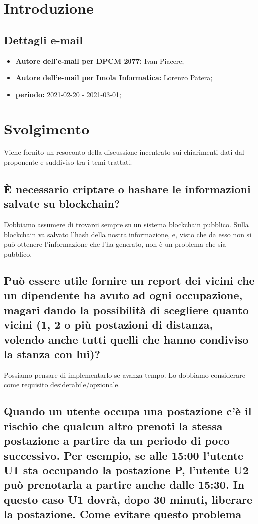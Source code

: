 \section*{Introduzione}
\subsection*{Dettagli e-mail}
\begin{itemize}
	\item \textbf{Autore dell'e-mail per DPCM 2077:} Ivan Piacere;
	\item \textbf{Autore dell'e-mail per Imola Informatica:} Lorenzo Patera;
	\item \textbf{periodo:} 2021-02-20 - 2021-03-01;
\end{itemize}

\section*{Svolgimento}
Viene fornito un resoconto della discussione incentrato sui chiarimenti dati dal proponente e suddiviso tra i temi trattati.


\subsection*{È necessario criptare o hashare le informazioni salvate su blockchain?}
Dobbiamo assumere di trovarci sempre su un sistema blockchain pubblico.
Sulla blockchain va salvato l'hash della nostra informazione, e, visto che da esso non si può ottenere l'informazione che l'ha generato, non è un problema che sia pubblico.


\subsection*{Può essere utile fornire un report dei vicini che un dipendente ha avuto ad ogni occupazione, magari dando la possibilità di scegliere quanto vicini (1, 2 o più postazioni di distanza, volendo anche tutti quelli che hanno condiviso la stanza con lui)?}
Possiamo pensare di implementarlo se avanza tempo. Lo dobbiamo considerare come requisito desiderabile/opzionale.


\subsection{Quando un utente occupa una postazione c’è il rischio che qualcun altro prenoti la stessa postazione a partire da un periodo di poco successivo. Per esempio, se alle 15:00 l’utente U1 sta occupando la postazione P, l’utente U2 può prenotarla a partire anche dalle 15:30. In questo caso U1 dovrà, dopo 30 minuti, liberare la postazione. Come evitare questo problema}
